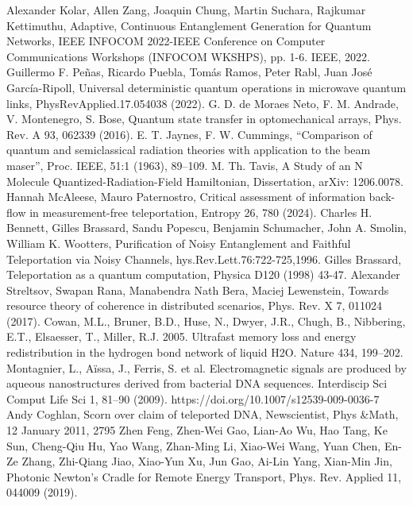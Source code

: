 \documentclass[12pt]{article}
\begin{document}
{\begin{thebibliography}{99}
 Alexander Kolar, Allen Zang, Joaquin Chung, Martin Suchara, Rajkumar Kettimuthu, Adaptive, Continuous Entanglement Generation for Quantum Networks, IEEE INFOCOM 2022-IEEE Conference on Computer Communications Workshops (INFOCOM WKSHPS), pp. 1-6. IEEE, 2022.
Guillermo F. Peñas, Ricardo Puebla, Tomás Ramos, Peter Rabl, Juan José García-Ripoll, Universal deterministic quantum operations in microwave quantum links, PhysRevApplied.17.054038 (2022).
 G. D. de Moraes Neto, F. M. Andrade, V. Montenegro, S. Bose, Quantum state transfer in optomechanical arrays, Phys. Rev. A 93, 062339 (2016).
E. T. Jaynes, F. W. Cummings, “Comparison of quantum and semiclassical radiation theories
with application to the beam maser”, Proc. IEEE, 51:1 (1963), 89–109.
 M. Th. Tavis, A Study of an N Molecule Quantized-Radiation-Field Hamiltonian, Dissertation,
arXiv: 1206.0078.
Hannah McAleese, Mauro Paternostro, Critical assessment of information back-flow in measurement-free teleportation, Entropy 26, 780 (2024).
Charles H. Bennett, Gilles Brassard, Sandu Popescu, Benjamin Schumacher, John A. Smolin, William K. Wootters, Purification of Noisy Entanglement and Faithful Teleportation via Noisy Channels, hys.Rev.Lett.76:722-725,1996.
Gilles Brassard, Teleportation as a quantum computation, Physica D120 (1998) 43-47.
 Alexander Streltsov, Swapan Rana, Manabendra Nath Bera, Maciej Lewenstein, Towards resource theory of coherence in distributed scenarios, Phys. Rev. X 7, 011024 (2017).
Cowan, M.L., Bruner, B.D., Huse, N., Dwyer, J.R., Chugh, B., Nibbering, E.T., Elsaesser, T., Miller, R.J. 2005. Ultrafast memory loss and energy redistribution in the hydrogen bond network of liquid H2O. Nature 434, 199–202.
Montagnier, L., Aïssa, J., Ferris, S. et al. Electromagnetic signals are produced by aqueous nanostructures derived from bacterial DNA sequences. Interdiscip Sci Comput Life Sci 1, 81–90 (2009). https://doi.org/10.1007/s12539-009-0036-7
 Andy Coghlan, Scorn over claim of teleported DNA, Newscientist, Phys \&Math, 12 January 2011, 2795
 Zhen Feng, Zhen-Wei Gao, Lian-Ao Wu, Hao Tang, Ke Sun, Cheng-Qiu Hu, Yao Wang, Zhan-Ming Li, Xiao-Wei Wang, Yuan Chen, En-Ze Zhang, Zhi-Qiang Jiao, Xiao-Yun Xu, Jun Gao, Ai-Lin Yang, Xian-Min Jin, Photonic Newton's Cradle for Remote Energy Transport, Phys. Rev. Applied 11, 044009 (2019).

\end{thebibliography}}
\end{document}
